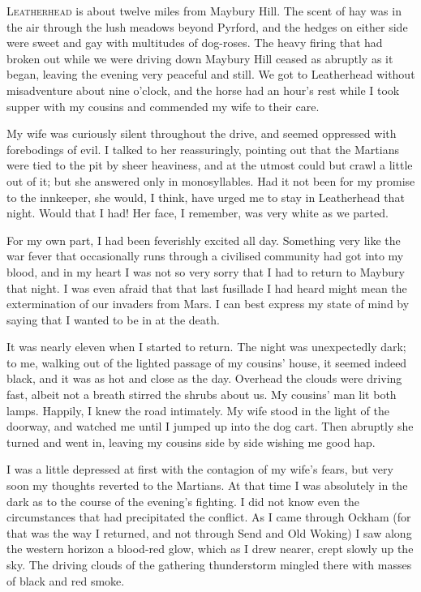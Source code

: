 

\lettrine[lines=4]{L}{eatherhead} is about twelve miles from Maybury Hill. The scent of hay was in the air through the lush meadows beyond Pyrford, and the hedges on either side were sweet and gay with multitudes of dog-roses. The heavy firing that had broken out while we were driving down Maybury Hill ceased as abruptly as it began, leaving the evening very peaceful and still. We got to Leatherhead without misadventure about nine o'clock, and the horse had an hour's rest while I took supper with my cousins and commended my wife to their care.

My wife was curiously silent throughout the drive, and seemed oppressed with forebodings of evil. I talked to her reassuringly, pointing out that the Martians were tied to the pit by sheer heaviness, and at the utmost could but crawl a little out of it; but she answered only in monosyllables. Had it not been for my promise to the innkeeper, she would, I think, have urged me to stay in Leatherhead that night. Would that I had! Her face, I remember, was very white as we parted.

For my own part, I had been feverishly excited all day. Something very like the war fever that occasionally runs through a civilised community had got into my blood, and in my heart I was not so very sorry that I had to return to Maybury that night. I was even afraid that that last fusillade I had heard might mean the extermination of our invaders from Mars. I can best express my state of mind by saying that I wanted to be in at the death.

It was nearly eleven when I started to return. The night was unexpectedly dark; to me, walking out of the lighted passage of my cousins' house, it seemed indeed black, and it was as hot and close as the day. Overhead the clouds were driving fast, albeit not a breath stirred the shrubs about us. My cousins' man lit both lamps. Happily, I knew the road intimately. My wife stood in the light of the doorway, and watched me until I jumped up into the dog cart. Then abruptly she turned and went in, leaving my cousins side by side wishing me good hap.

I was a little depressed at first with the contagion of my wife's fears, but very soon my thoughts reverted to the Martians. At that time I was absolutely in the dark as to the course of the evening's fighting. I did not know even the circumstances that had precipitated the conflict. As I came through Ockham (for that was the way I returned, and not through Send and Old Woking) I saw along the western horizon a blood-red glow, which as I drew nearer, crept slowly up the sky. The driving clouds of the gathering thunderstorm mingled there with masses of black and red smoke.

